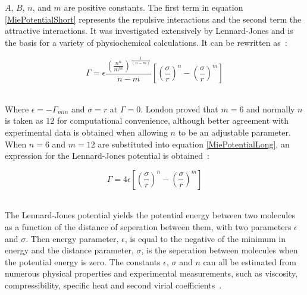 $A$, $B$, $n$, and $m$ are positive constants. The first term in equation \ref{MiePotentialShort} represents the repulsive interactions and the second term the attractive interactions. It was investigated extensively by Lennard-Jones and is the basis for a variety of physiochemical calculations. It can be rewritten as~\cite{MolecularThermodynamicsOfFluidPhaseEquilibria}:\

\begin{equation}
\Gamma = \epsilon \frac{\left( \frac{n^{n}}{m^{m}} \right)^{\frac{1}{\left(n-m\right)}}}{n-m}\left[\left(\frac{\sigma}{r}\right)^{n}-\left(\frac{\sigma}{r}\right)^{m}\right] \label{MiePotentialLong}
\end{equation}\
 
 
Where $\epsilon = -\Gamma_{min}$ and $\sigma = r$ at $\Gamma = 0$. London proved that $m = 6$ and normally $n$ is taken as $12$ for computational convenience, although better agreement with experimental data is obtained when allowing $n$ to be an adjustable parameter. When $n = 6$ and $m = 12$ are substituted into equation \ref{MiePotentialLong}, an expression for the Lennard-Jones potential is obtained~\cite{MolecularThermodynamicsOfFluidPhaseEquilibria}:\

\begin{equation}
\Gamma = 4\epsilon\left[\left(\frac{\sigma}{r}\right)^{n}-\left(\frac{\sigma}{r}\right)^{m}\right] \label{LennardJones}
\end{equation}\


The Lennard-Jones potential yields the potential energy between two molecules as a function of the distance of seperation between them, with two parameters $\epsilon$ and $\sigma$. Then energy parameter, $\epsilon$, is equal to the negative of the minimum in energy and the distance parameter, $\sigma$, is the seperation between molecules when the potential energy is zero. The constants $\epsilon$, $\sigma$ and $n$ can all be estimated from numerous physical properties and experimental measurements, such as viscosity, compressibility, specific heat and second virial coefficients~\cite{MolecularThermodynamicsOfFluidPhaseEquilibria}.\\

